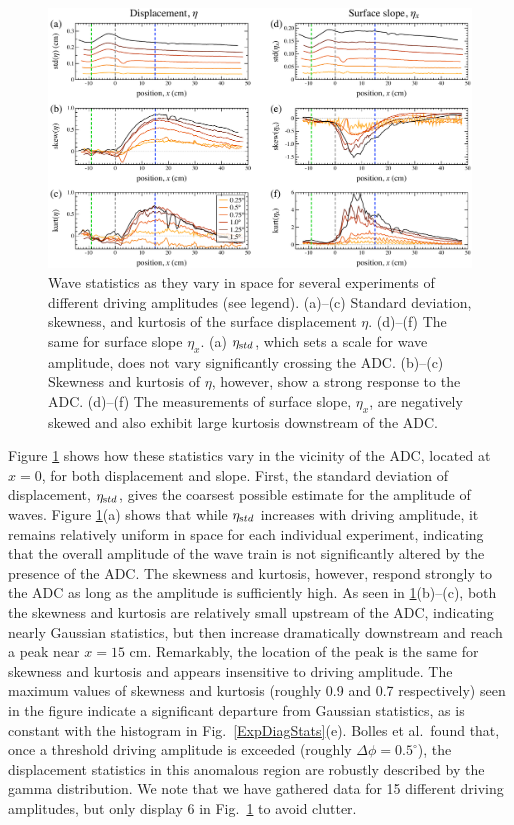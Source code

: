 \documentclass[11pt]{article}
\newcommand{\etastd}{\eta_{\text std}}
\newcommand{\Dphi}{\Delta \phi}
\begin{document}
\begin{figure}%
\begin{center}
\includegraphics[width = 0.80 \linewidth]{Figs/ExpSpatialStats.pdf}
\caption{Wave statistics as they vary in space for several experiments of different driving amplitudes (see legend). (a)--(c) Standard deviation, skewness, and kurtosis of the surface displacement $\eta$. (d)--(f) The same for surface slope $\eta_x$. (a) $\etastd$, which sets a scale for wave amplitude, does not vary significantly crossing the ADC. (b)--(c) Skewness and kurtosis of $\eta$, however, show a strong response to the ADC. (d)--(f) The measurements of surface slope, $\eta_x$, are negatively skewed and also exhibit large kurtosis downstream of the ADC. }
\label{ExpSpatialStats}
\end{center}
\end{figure}
 
	Figure \ref{ExpSpatialStats} shows how these statistics vary in the vicinity of the ADC, located at $x = 0$, for both displacement and slope. First, the standard deviation of displacement, $\etastd$, gives the coarsest possible estimate for the amplitude of waves. Figure \ref{ExpSpatialStats}(a) shows that while $\etastd$ increases with driving amplitude, it remains relatively uniform in space for each individual experiment, indicating that the overall amplitude of the wave train is not significantly altered by the presence of the ADC. The skewness and kurtosis, however, respond strongly to the ADC as long as the amplitude is sufficiently high. As seen in \ref{ExpSpatialStats}(b)--(c), both the skewness and kurtosis are relatively small upstream of the ADC, indicating nearly Gaussian statistics, but then increase dramatically downstream and reach a peak near $x = 15$ cm. Remarkably, the location of the peak is the same for skewness and kurtosis and appears insensitive to driving amplitude. The maximum values of skewness and kurtosis (roughly 0.9 and 0.7 respectively) seen in the figure indicate a significant departure from Gaussian statistics, as is constant with the histogram in Fig.~\ref{ExpDiagStats}(e). Bolles et al.~found that, once a threshold driving amplitude is exceeded (roughly $\Dphi = 0.5^{\circ}$), the displacement statistics in this anomalous region are robustly described by the gamma distribution. We note that we have gathered data for 15 different driving amplitudes, but only display 6 in Fig.~\ref{ExpSpatialStats} to avoid clutter. 
\end{document}
